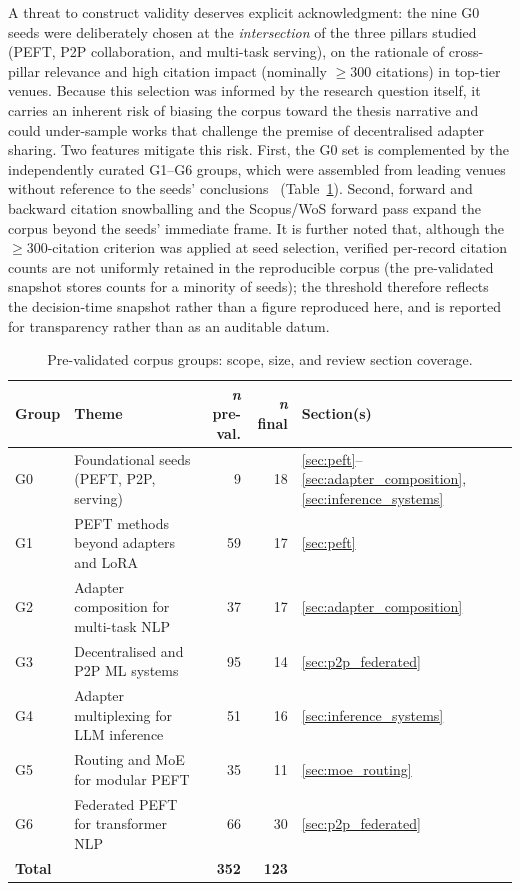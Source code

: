 A threat to construct validity deserves explicit acknowledgment: the nine G0
seeds were deliberately chosen at the \emph{intersection} of the three pillars
studied (PEFT, P2P collaboration, and multi-task serving), on the rationale of
cross-pillar relevance and high citation impact (nominally $\geq$300 citations)
in top-tier venues. Because this selection was informed by the research
question itself, it carries an inherent risk of biasing the corpus toward the
thesis narrative and could under-sample works that challenge the premise of
decentralised adapter sharing. Two features mitigate this risk. First, the G0
set is complemented by the independently curated G1--G6 groups, which were
assembled from leading venues without reference to the seeds'
conclusions~\cite{XiaoWatson2019} (Table~\ref{tab:groups}). Second, forward and
backward citation snowballing and the Scopus/WoS forward pass expand the corpus
beyond the seeds' immediate frame. It is further noted that, although the
$\geq$300-citation criterion was applied at seed selection, verified per-record
citation counts are not uniformly retained in the reproducible corpus (the
pre-validated snapshot stores counts for a minority of seeds); the threshold
therefore reflects the decision-time snapshot rather than a figure reproduced
here, and is reported for transparency rather than as an auditable datum.

\begin{table}[H]
\centering
\caption{Pre-validated corpus groups: scope, size, and review section coverage.}
\label{tab:groups}
\begin{tabular}{lp{5cm}rrl}
\toprule
\textbf{Group} & \textbf{Theme} & \textbf{\textit{n} pre-val.} &
\textbf{\textit{n} final} & \textbf{Section(s)} \\
\midrule
G0 & Foundational seeds (PEFT, P2P, serving) & 9   & 18  &
\ref{sec:peft}--\ref{sec:adapter_composition}, \ref{sec:inference_systems} \\
G1 & PEFT methods beyond adapters and LoRA   & 59  & 17  & \ref{sec:peft} \\
G2 & Adapter composition for multi-task NLP  & 37  & 17  &
\ref{sec:adapter_composition} \\
G3 & Decentralised and P2P ML systems        & 95  & 14  &
\ref{sec:p2p_federated} \\
G4 & Adapter multiplexing for LLM inference  & 51  & 16  &
\ref{sec:inference_systems} \\
G5 & Routing and MoE for modular PEFT        & 35  & 11  &
\ref{sec:moe_routing} \\
G6 & Federated PEFT for transformer NLP      & 66  & 30  &
\ref{sec:p2p_federated} \\
\midrule
\textbf{Total} & & \textbf{352} & \textbf{123} & \\
\bottomrule
\end{tabular}
\end{table}

